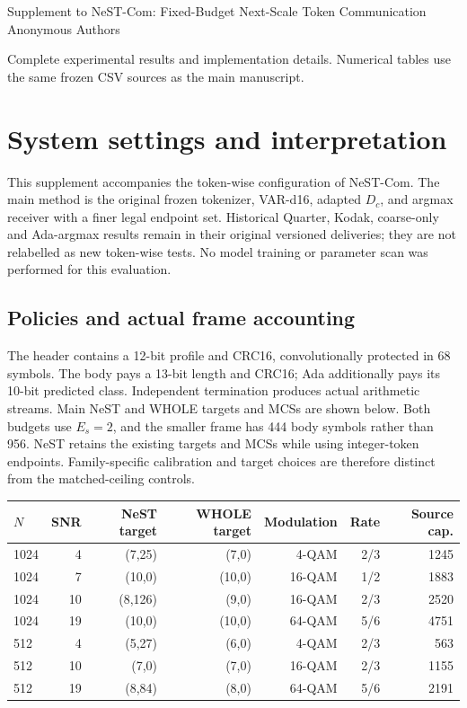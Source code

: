 \documentclass[10pt,letterpaper]{article}
\begin{document}
\begin{center}\Large Supplement to NeST-Com: Fixed-Budget Next-Scale Token Communication\\[4pt]\normalsize Anonymous Authors\end{center}
Complete experimental results and implementation details. Numerical tables use the same frozen CSV sources as the main manuscript.
\section{System settings and interpretation}
This supplement accompanies the token-wise configuration of NeST-Com. The main method is the original frozen tokenizer, VAR-d16, adapted $D_c$, and argmax receiver with a finer legal endpoint set. Historical Quarter, Kodak, coarse-only and Ada-argmax results remain in their original versioned deliveries; they are not relabelled as new token-wise tests. No model training or parameter scan was performed for this evaluation.

\subsection{Policies and actual frame accounting}
The header contains a 12-bit profile and CRC16, convolutionally protected in 68 symbols. The body pays a 13-bit length and CRC16; Ada additionally pays its 10-bit predicted class. Independent termination produces actual arithmetic streams. Main NeST and WHOLE targets and MCSs are shown below. Both budgets use $E_s=2$, and the smaller frame has 444 body symbols rather than 956. NeST retains the existing targets and MCSs while using integer-token endpoints. Family-specific calibration and target choices are therefore distinct from the matched-ceiling controls.

\begin{longtable}{@{}lrrrrrr@{}}\toprule
$N$ & SNR & NeST target & WHOLE target & Modulation & Rate & Source cap.\\\midrule\endhead
1024 & 4 & (7,25) & (7,0) & 4-QAM & 2/3 & 1245\\
1024 & 7 & (10,0) & (10,0) & 16-QAM & 1/2 & 1883\\
1024 & 10 & (8,126) & (9,0) & 16-QAM & 2/3 & 2520\\
1024 & 19 & (10,0) & (10,0) & 64-QAM & 5/6 & 4751\\
512 & 4 & (5,27) & (6,0) & 4-QAM & 2/3 & 563\\
512 & 10 & (7,0) & (7,0) & 16-QAM & 2/3 & 1155\\
512 & 19 & (8,84) & (8,0) & 64-QAM & 5/6 & 2191\\
\bottomrule\end{longtable}
\end{document}
